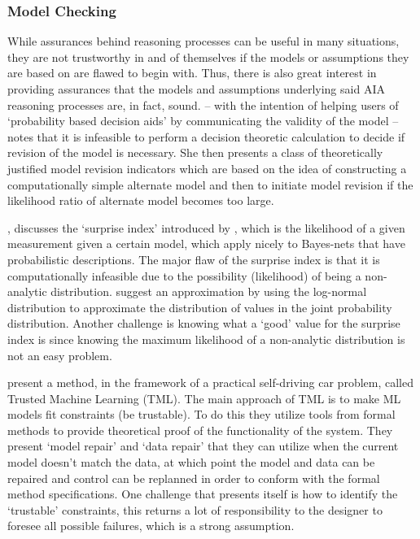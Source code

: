 \subsubsection{Model Checking}
    While assurances behind reasoning processes can be useful in many situations, they are not trustworthy in and of themselves if the models or assumptions they are based on are flawed to begin with. Thus, there is also great interest in providing assurances that the models and assumptions underlying said AIA reasoning processes are, in fact, sound. \citet{Laskey1991-mf} -- with the intention of helping users of `probability based decision aids' by communicating the validity of the model -- notes that it is infeasible to perform a decision theoretic calculation to decide if revision of the model is necessary. She then presents a class of theoretically justified model revision indicators which are based on the idea of constructing a computationally simple alternate model and then to initiate model revision if the likelihood ratio of alternate model becomes too large. 

    \citet{Zagorecki2015-qy}, discusses the `surprise index' introduced by \citet{Habbema1976-xd}, which is the likelihood of a given measurement given a certain model, which apply nicely to Bayes-nets that have probabilistic descriptions. The major flaw of the surprise index is that it is computationally infeasible due to the possibility (likelihood) of being a non-analytic distribution. \citeauthor{Zagorecki2015-qy} suggest an approximation by using the log-normal distribution to approximate the distribution of values in the joint probability distribution. Another challenge is knowing what a `good' value for the surprise index is since knowing the maximum likelihood of a non-analytic distribution is not an easy problem.

    \citet{Ghosh2016-dl} present a method, in the framework of a practical self-driving car problem, called Trusted Machine Learning (TML). The main approach of TML is to make ML models fit constraints (be trustable). To do this they utilize tools from formal methods to provide theoretical proof of the functionality of the system. They present `model repair' and `data repair' that they can utilize when the current model doesn't match the data, at which point the model and data can be repaired and control can be replanned in order to conform with the formal method specifications. One challenge that presents itself is how to identify the `trustable' constraints, this returns a lot of responsibility to the designer to foresee all possible failures, which is a strong assumption.

